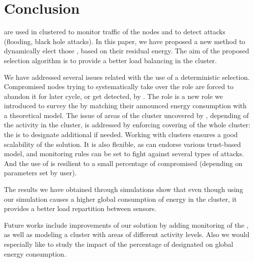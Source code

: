 \section{Conclusion}

\cns are used in clustered \wsns to monitor traffic of the nodes and to detect \dos attacks (\eg flooding, black hole attacks).
In this paper, we have proposed a new method to dynamically elect those \cns, based on their residual energy.
The aim of the proposed selection algorithm is to provide a better load balancing in the cluster.

We have addressed several issues related with the use of a deterministic selection.
Compromised nodes trying to systematically take over the \cn role are forced to abandon it for later cycle, or get detected, by \vns.
The \vn role is a new role we introduced to survey the \cns by matching their announced energy consumption with a theoretical model.
The issue of areas of the cluster uncovered by \cns, depending of the activity in the cluster, is addressed by enforcing covering of the whole cluster: the \ch is to designate additional \cns if needed.
Working with clusters ensures a good scalability of the solution.
It is also flexible, as \cns can endorse various trust-based model, and monitoring rules can be set to fight against several types of \dos attacks.
And the use of \vns is resilient to a small percentage of compromised \vns (depending on parameters set by user).

The results we have obtained through simulations show that even though using our simulation causes a higher global consumption of energy in the cluster, it provides a better load repartition between sensors.

Future works include improvements of our solution by adding monitoring of the \ch, as well as modeling a cluster with areas of different activity levels.
Also we would especially like to study the impact of the percentage of designated \vns on global energy consumption.

